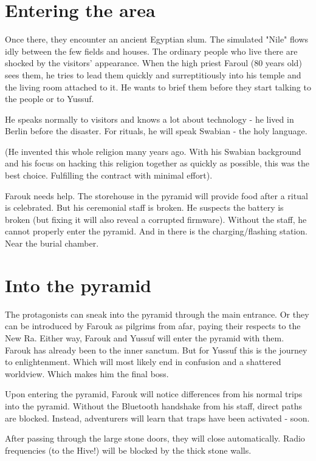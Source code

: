 \section{Entering the area}

Once there, they encounter an ancient Egyptian slum. The simulated "Nile" flows idly between the few fields and houses. The ordinary people who live there are shocked by the visitors' appearance. When the high priest Faroul (80 years old) sees them, he tries to lead them quickly and surreptitiously into his temple and the living room attached to it. He wants to brief them before they start talking to the people or to Yussuf.

He speaks normally to visitors and knows a lot about technology - he lived in Berlin before the disaster. For rituals, he will speak Swabian - the holy language.

(He invented this whole religion many years ago. With his Swabian background and his focus on hacking this religion together as quickly as possible, this was the best choice. Fulfilling the contract with minimal effort).

Farouk needs help. The storehouse in the pyramid will provide food after a ritual is celebrated. But his ceremonial staff is broken. He suspects the battery is broken (but fixing it will also reveal a corrupted firmware). Without the staff, he cannot properly enter the pyramid. And in there is the charging/flashing station. Near the burial chamber.

\section{Into the pyramid}

The protagonists can sneak into the pyramid through the main entrance. Or they can be introduced by Farouk as pilgrims from afar, paying their respects to the New Ra. Either way, Farouk and Yussuf will enter the pyramid with them. Farouk has already been to the inner sanctum. But for Yussuf this is the journey to enlightenment. Which will most likely end in confusion and a shattered worldview. Which makes him the final boss.

Upon entering the pyramid, Farouk will notice differences from his normal trips into the pyramid. Without the Bluetooth handshake from his staff, direct paths are blocked. Instead, adventurers will learn that traps have been activated - soon.

After passing through the large stone doors, they will close automatically. Radio frequencies (to the Hive!) will be blocked by the thick stone walls.

